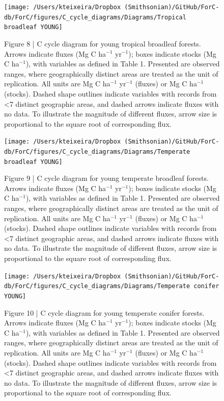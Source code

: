 \documentclass[
]{article}
\begin{document}
\newpage
\begin{landscape}
\begin{figure}[H]

{\centering \texttt{[image: /Users/kteixeira/Dropbox (Smithsonian)/GitHub/ForC-db/ForC/figures/C\_cycle\_diagrams/Diagrams/Tropical broadleaf YOUNG]} 

}

\caption{Figure 8 | C cycle diagram for young tropical broadleaf forests. Arrows indicate fluxes (Mg C ha$^{-1}$ yr$^{-1}$); boxes indicate stocks (Mg C ha$^{-1}$), with variables as defined in Table 1. Presented are observed ranges, where geographically distinct areas are treated as the unit of replication. All units are Mg C ha$^{-1}$ yr$^{-1}$ (fluxes) or Mg C ha$^{-1}$ (stocks). Dashed shape outlines indicate variables with records from <7 distinct geographic areas, and dashed arrows indicate fluxes with no data. To illustrate the magnitude of different fluxes, arrow size is proportional to the square root of corresponding flux.}\label{fig:unnamed-chunk-15}
\end{figure}

\begin{figure}[H]

{\centering \texttt{[image: /Users/kteixeira/Dropbox (Smithsonian)/GitHub/ForC-db/ForC/figures/C\_cycle\_diagrams/Diagrams/Temperate broadleaf YOUNG]} 

}

\caption{Figure 9 | C cycle diagram for young temperate broadleaf forests. Arrows indicate fluxes (Mg C ha$^{-1}$ yr$^{-1}$); boxes indicate stocks (Mg C ha$^{-1}$), with variables as defined in Table 1. Presented are observed ranges, where geographically distinct areas are treated as the unit of replication. All units are Mg C ha$^{-1}$ yr$^{-1}$ (fluxes) or Mg C ha$^{-1}$ (stocks). Dashed shape outlines indicate variables with records from <7 distinct geographic areas, and dashed arrows indicate fluxes with no data. To illustrate the magnitude of different fluxes, arrow size is proportional to the square root of corresponding flux.}\label{fig:unnamed-chunk-16}
\end{figure}

\begin{figure}[H]

{\centering \texttt{[image: /Users/kteixeira/Dropbox (Smithsonian)/GitHub/ForC-db/ForC/figures/C\_cycle\_diagrams/Diagrams/Temperate conifer YOUNG]} 

}

\caption{Figure 10 | C cycle diagram for young temperate conifer forests. Arrows indicate fluxes (Mg C ha$^{-1}$ yr$^{-1}$); boxes indicate stocks (Mg C ha$^{-1}$), with variables as defined in Table 1. Presented are observed ranges, where geographically distinct areas are treated as the unit of replication. All units are Mg C ha$^{-1}$ yr$^{-1}$ (fluxes) or Mg C ha$^{-1}$ (stocks). Dashed shape outlines indicate variables with records from <7 distinct geographic areas, and dashed arrows indicate fluxes with no data. To illustrate the magnitude of different fluxes, arrow size is proportional to the square root of corresponding flux.}\label{fig:unnamed-chunk-17}
\end{figure}


\end{landscape}
\end{document}
